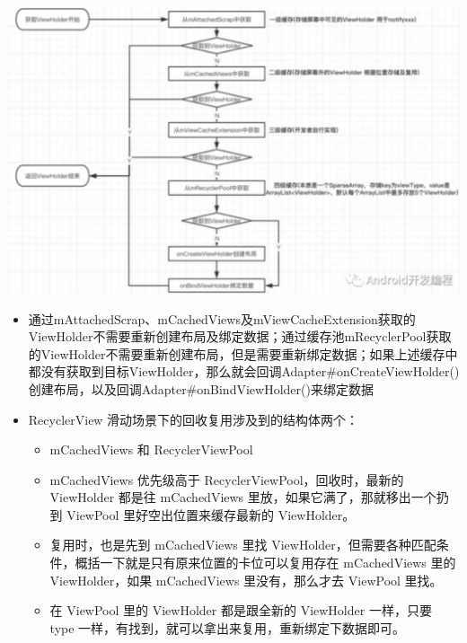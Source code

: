 \documentclass[9pt, b5paper]{article}
\begin{document}
\includegraphics[width=.9\linewidth]{./pic/cache2.png}

\begin{itemize}
\item 通过mAttachedScrap、mCachedViews及mViewCacheExtension获取的ViewHolder不需要重新创建布局及绑定数据；通过缓存池mRecyclerPool获取的ViewHolder不需要重新创建布局，但是需要重新绑定数据；如果上述缓存中都没有获取到目标ViewHolder，那么就会回调Adapter\#onCreateViewHolder()创建布局，以及回调Adapter\#onBindViewHolder()来绑定数据
\item RecyclerView 滑动场景下的回收复用涉及到的结构体两个：
\begin{itemize}
\item mCachedViews 和 RecyclerViewPool
\item mCachedViews 优先级高于 RecyclerViewPool，回收时，最新的 ViewHolder 都是往 mCachedViews 里放，如果它满了，那就移出一个扔到 ViewPool 里好空出位置来缓存最新的 ViewHolder。
\item 复用时，也是先到 mCachedViews 里找 ViewHolder，但需要各种匹配条件，概括一下就是只有原来位置的卡位可以复用存在 mCachedViews 里的 ViewHolder，如果 mCachedViews 里没有，那么才去 ViewPool 里找。
\item 在 ViewPool 里的 ViewHolder 都是跟全新的 ViewHolder 一样，只要 type 一样，有找到，就可以拿出来复用，重新绑定下数据即可。
\end{itemize}
\end{itemize}
\end{document}
